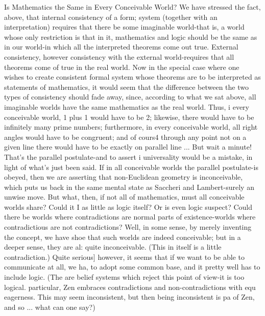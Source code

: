 Is Mathematics the Same in Every Conceivable World? We have stressed the fact, above, that internal consistency of a form; system (together with an interpretation) requires that there be some imaginable world-that is, a world whose only restriction is that in it, mathematics and logic should be the same as in our world-in which all the interpreted theorems come out true. External consistency, however consistency with the external world-requires that all theorems come of true in the real world. Now in the special case where one wishes to create consistent formal system whose theorems are to be interpreted as statements of mathematics, it would seem that the difference between the two types of consistency should fade away, since, according to what we sat above, all imaginable worlds have the same mathematics as the real world. Thus, i every conceivable world, 1 plus 1 would have to be 2; likewise, there would have to be infinitely many prime numbers; furthermore, in every conceivable world, all right angles would have to be congruent; and of cours4 through any point not on a given line there would have to be exactly on parallel line ... But wait a minute! That's the parallel postulate-and to assert i universality would be a mistake, in light of what's just been said. If in all conceivable worlds the parallel postulate-is obeyed, then we are asserting that non-Euclidean geometry is inconceivable, which puts us back in the same mental state as Saccheri and Lambert-surely an unwise move. But what, then, if not all of mathematics, must all conceivable worlds share? Could it I as little as logic itself? Or is even logic suspect? Could there be worlds where contradictions are normal parts of existence-worlds where contradictious are not contradictions? Well, in some sense, by merely inventing the concept, we have shoe that such worlds are indeed conceivable; but in a deeper sense, they are al: quite inconceivable. (This in itself is a little contradiction.) Quite serious] however, it seems that if we want to be able to communicate at all, we ha, to adopt some common base, and it pretty well has to include logic. (The are belief systems which reject this point of view-it is too logical. particular, Zen embraces contradictions and non-contradictions with equ eagerness. This may seem inconsistent, but then being inconsistent is pa of Zen, and so ... what can one say?) 







